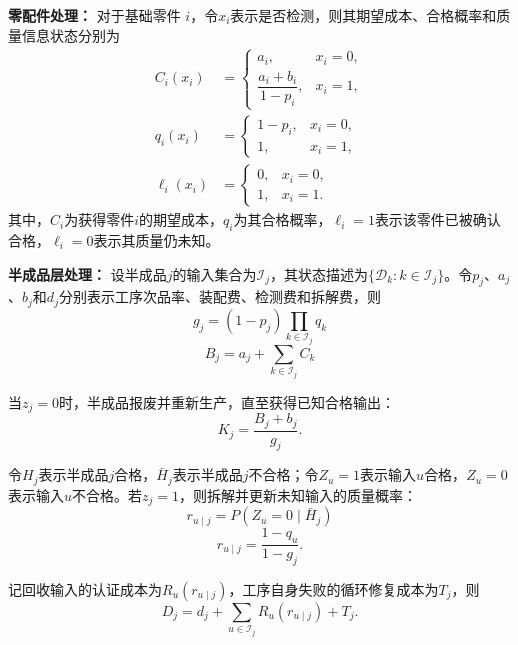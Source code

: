 \documentclass[withoutpreface,bwprint]{cumcmthesis}
\numberwithin{equation}{section}
\begin{document}
\textbf{零配件处理：} 对于基础零件 $i$，令$x_i$表示是否检测，则其期望成本、合格概率和质量信息状态分别为
\begin{equation}
\begin{aligned}
C_i(x_i)&=
\begin{cases}
a_i, & x_i=0,\\[2pt]
\dfrac{a_i+b_i}{1-p_i}, & x_i=1,
\end{cases}
\\[6pt]
q_i(x_i)&=
\begin{cases}
1-p_i, & x_i=0,\\
1, & x_i=1,
\end{cases}
\\[6pt]
\ell_i(x_i)&=
\begin{cases}
0, & x_i=0,\\
1, & x_i=1.
\end{cases}
\end{aligned}
\end{equation}
其中，$C_i$为获得零件$i$的期望成本，$q_i$为其合格概率，$\ell_i=1$表示该零件已被确认合格，$\ell_i=0$表示其质量仍未知。

\textbf{半成品层处理：} 设半成品$j$的输入集合为$\mathcal{I}_j$，其状态描述为$\{\mathcal{D}_k:k\in\mathcal{I}_j\}$。令$p_j$、$a_j$、$b_j$和$d_j$分别表示工序次品率、装配费、检测费和拆解费，则
\begin{equation}
g_j=(1-p_j)\prod_{k\in\mathcal{I}_j}q_k
\end{equation}
\begin{equation}
B_j=a_j+\sum_{k\in\mathcal{I}_j}C_k
\end{equation}

当$z_j=0$时，半成品报废并重新生产，直至获得已知合格输出：
\begin{equation}
K_j=\frac{B_j+b_j}{g_j}.
\end{equation}

令$H_j$表示半成品$j$合格，$\bar H_j$表示半成品$j$不合格；令$Z_u=1$表示输入$u$合格，$Z_u=0$表示输入$u$不合格。若$z_j=1$，则拆解并更新未知输入的质量概率：
\begin{equation}
r_{u\mid j}=P(Z_u=0\mid\bar H_j)
\end{equation}
\begin{equation}
r_{u\mid j}=\frac{1-q_u}{1-g_j}.
\end{equation}

记回收输入的认证成本为$R_u(r_{u\mid j})$，工序自身失败的循环修复成本为$T_j$，则
\begin{equation}
D_j=d_j+\sum_{u\in\mathcal{I}_j}R_u(r_{u\mid j})+T_j.
\end{equation}
\end{document}
